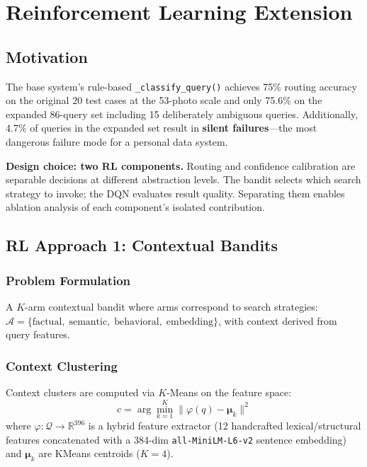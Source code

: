 \documentclass[11pt,letterpaper]{article}
\begin{document}
\section{Reinforcement Learning Extension}
\label{sec:rl}

\subsection{Motivation}

The base system's rule-based \texttt{\_classify\_query()} achieves 75\% routing accuracy on the original 20 test cases at the 53-photo scale and only 75.6\% on the expanded 86-query set including 15 deliberately ambiguous queries. Additionally, 4.7\% of queries in the expanded set result in \textbf{silent failures}---the most dangerous failure mode for a personal data system.

\textbf{Design choice: two RL components.} Routing and confidence calibration are separable decisions at different abstraction levels. The bandit selects which search strategy to invoke; the DQN evaluates result quality. Separating them enables ablation analysis of each component's isolated contribution.

\subsection{RL Approach 1: Contextual Bandits}
\label{sec:bandit}

\subsubsection{Problem Formulation}

A $K$-arm contextual bandit where arms correspond to search strategies: $\mathcal{A} = \{\text{factual},\; \text{semantic},\; \text{behavioral},\; \text{embedding}\}$, with context derived from query features.

\subsubsection{Context Clustering}

Context clusters are computed via $K$-Means on the feature space:
\begin{equation}
  c = \arg\min_{k=1}^{K} \| \varphi(q) - \boldsymbol{\mu}_k \|^2
\end{equation}
where $\varphi: \mathcal{Q} \to \mathbb{R}^{396}$ is a hybrid feature extractor (12 handcrafted lexical/structural features concatenated with a 384-dim \texttt{all-MiniLM-L6-v2} sentence embedding) and $\boldsymbol{\mu}_k$ are KMeans centroids ($K=4$).
\end{document}
